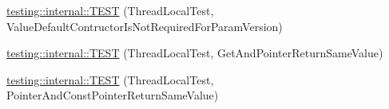 \begin{DoxyCompactItemize}
\item 
\mbox{\hyperlink{namespacetesting_1_1internal_a6dffc8331590224259b60e855ad07d03}{testing\+::internal\+::\+T\+E\+ST}} (Thread\+Local\+Test, Value\+Default\+Contructor\+Is\+Not\+Required\+For\+Param\+Version)
\item 
\mbox{\hyperlink{namespacetesting_1_1internal_a0e7c2d58a313bec0821df19f44351d84}{testing\+::internal\+::\+T\+E\+ST}} (Thread\+Local\+Test, Get\+And\+Pointer\+Return\+Same\+Value)
\item 
\mbox{\hyperlink{namespacetesting_1_1internal_aaed45d6ba960f02e8d3d042c606bc98e}{testing\+::internal\+::\+T\+E\+ST}} (Thread\+Local\+Test, Pointer\+And\+Const\+Pointer\+Return\+Same\+Value)
\end{DoxyCompactItemize}
